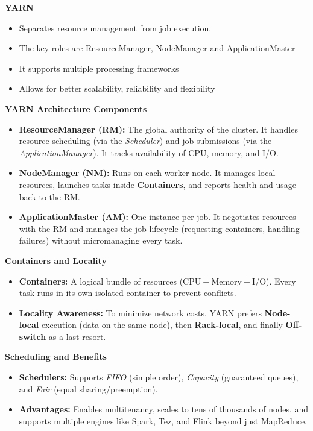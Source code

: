 \textbf{YARN}

\begin{itemize}
    \item Separates resource management from job execution.
    \item The key roles are ResourceManager, NodeManager and ApplicationMaster
    \item It supports multiple processing frameworks
    \item Allows for better scalability, reliability and flexibility
\end{itemize}

\textbf{YARN Architecture Components}\begin{itemize}\item \textbf{ResourceManager (RM):} The global authority of the cluster. It handles resource scheduling (via the \textit{Scheduler}) and job submissions (via the \textit{ApplicationManager}). It tracks availability of $\text{CPU}$, memory, and $\text{I/O}$.\item \textbf{NodeManager (NM):} Runs on each worker node. It manages local resources, launches tasks inside \textbf{Containers}, and reports health and usage back to the RM.\item \textbf{ApplicationMaster (AM):} One instance per job. It negotiates resources with the RM and manages the job lifecycle (requesting containers, handling failures) without micromanaging every task.\end{itemize}\textbf{ Containers and Locality}\begin{itemize}\item \textbf{Containers:} A logical bundle of resources ($\text{CPU} + \text{Memory} + \text{I/O}$). Every task runs in its own isolated container to prevent conflicts.\item \textbf{Locality Awareness:} To minimize network costs, YARN prefers \textbf{Node-local} execution (data on the same node), then \textbf{Rack-local}, and finally \textbf{Off-switch} as a last resort.\end{itemize}\textbf{ Scheduling and Benefits}\begin{itemize}\item \textbf{Schedulers:} Supports \textit{FIFO} (simple order), \textit{Capacity} (guaranteed queues), and \textit{Fair} (equal sharing/preemption).\item \textbf{Advantages:} Enables multitenancy, scales to tens of thousands of nodes, and supports multiple engines like Spark, Tez, and Flink beyond just MapReduce.\end{itemize}

